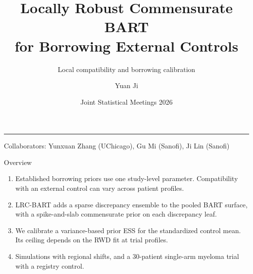\documentclass[11pt,aspectratio=169]{beamer}
\title[LRC-BART]{Locally Robust Commensurate BART\\for Borrowing External Controls}
\subtitle{Local compatibility and borrowing calibration}
\author{Yuan Ji}
\institute{University of Chicago\\Department of Public Health Sciences}
\date{Joint Statistical Meetings 2026}
\begin{document}
\begin{frame}[plain]
  \vspace{0.7em}
  {\inserttitle\par}
  \vspace{0.5em}
  {\insertsubtitle\par}
  \vspace{1em}
  {\color{red!70}\rule{\textwidth}{0.4pt}}
  \vfill
  {\insertauthor\par}
  \vspace{0.45em}
  {\small Collaborators: Yunxuan Zhang (UChicago), Gu Mi (Sanofi), Ji Lin (Sanofi)\par}
  \vspace{0.35em}
  {\insertdate\par}
  \vspace{0.9em}
  {\insertinstitute\par}
  \vspace{0.7em}
\end{frame}

\begin{frame}{Overview}
  \begin{enumerate}
    \item Established borrowing priors use one study-level parameter. Compatibility with an external control can vary across patient profiles.
    \item LRC-BART adds a sparse discrepancy ensemble to the pooled BART surface, with a spike-and-slab commensurate prior on each discrepancy leaf.
    \item We calibrate a variance-based prior ESS for the standardized control mean. Its ceiling depends on the RWD fit at trial profiles.
    \item Simulations with regional shifts, and a 30-patient single-arm myeloma trial with a registry control.
  \end{enumerate}
\end{frame}
\end{document}
